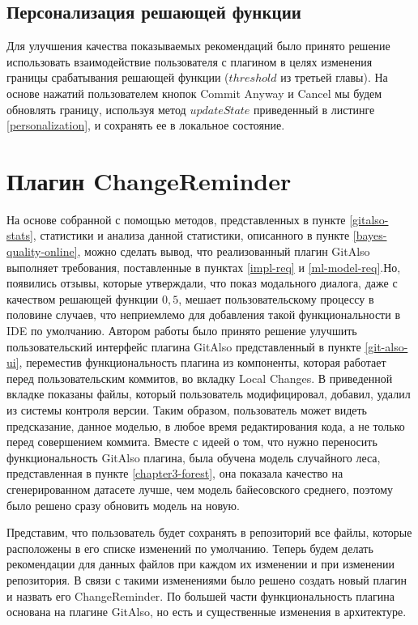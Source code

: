 \subsection{Персонализация решающей функции}
Для улучшения качества показываемых рекомендаций было принято решение использовать взаимодействие пользователя с плагином в целях изменения границы срабатывания решающей функции ($threshold$ из третьей главы). На основе нажатий пользователем кнопок Commit Anyway и Cancel мы будем обновлять границу, используя метод $updateState$ приведенный в листинге \ref{personalization}, и сохранять ее в локальное состояние.
\section{Плагин ChangeReminder}\label{changereminder-main}
На основе собранной с помощью методов, представленных в пункте \ref{gitalso-stats}, статистики и анализа данной статистики, описанного в пункте \ref{bayes-quality-online}, можно сделать вывод, что реализованный плагин GitAlso выполняет требования, поставленные в пунктах \ref{impl-req} и \ref{ml-model-req}.Но, появились отзывы, которые утверждали, что показ модального диалога, даже с качеством решающей функции $0,5$, мешает пользовательскому процессу в половине случаев, что неприемлемо для добавления такой функциональности в IDE по умолчанию. Автором работы было принято решение улучшить пользовательский интерфейс плагина GitAlso представленный в пункте \ref{git-also-ui}, переместив функциональность плагина из компоненты, которая работает перед пользовательским коммитов, во вкладку Local Changes. В приведенной вкладке показаны файлы, который пользователь модифицировал, добавил, удалил из системы контроля версии. Таким образом, пользователь может видеть предсказание, данное моделью, в любое время редактирования кода, а не только перед совершением коммита. Вместе с идеей о том, что нужно переносить функциональность GitAlso плагина, была обучена модель случайного леса, представленная в пункте \ref{chapter3-forest}, она показала качество на сгенерированном датасете лучше, чем модель байесовского среднего, поэтому было решено сразу обновить модель на новую.

Представим, что пользователь будет сохранять в репозиторий все файлы, которые расположены в его списке изменений по умолчанию. Теперь будем делать рекомендации для данных файлов при каждом их изменении и при изменении репозитория. В связи с такими изменениями было решено создать новый плагин и назвать его ChangeReminder. По большей части функциональность плагина основана на плагине GitAlso, но есть и существенные изменения в архитектуре.
